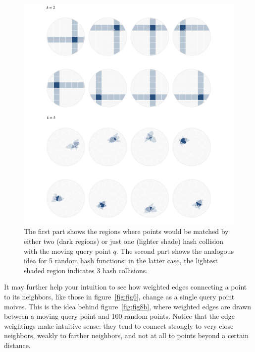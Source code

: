 \documentclass[20pt,]{extarticle}
\begin{document}
\begin{figure}
\centering
\includegraphics{images/image8a_fixed.png}
\caption{The first part shows the regions where points would be matched
by either two (dark regions) or just one (lighter shade) hash collision
with the moving query point \(q\). The second part shows the analogous
idea for 5 random hash functions; in the latter case, the lightest
shaded region indicates 3 hash collisions.}\label{fig:fig8a}
\end{figure}

It may further help your intuition to see how weighted edges connecting
a point to its neighbors, like those in figure~\ref{fig:fig6}, change as
a single query point moives. This is the idea behind
figure~\ref{fig:fig8b}, where weighted edges are drawn between a moving
query point and 100 random points. Notice that the edge weightings make
intuitive sense: they tend to connect strongly to very close neighbors,
weakly to farther neighbors, and not at all to points beyond a certain
distance.
\end{document}
